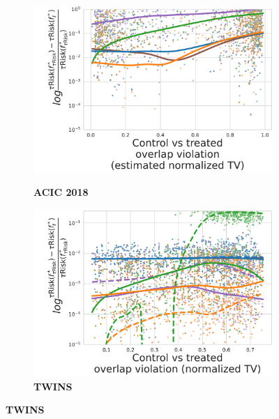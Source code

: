 \documentclass[11pt]{article}
\begin{document}
\begin{appendices}
\begin{figure}
\begin{subfigure}[b]{0.10\textwidth}
        \end{subfigure}
        \begin{subfigure}[b]{0.44\textwidth}
            \centering
            \caption{\textbf{ACIC 2018}}
            \includegraphics[width=\textwidth]{images/normalized_bias_tau_risk_to_best_method_acic_2018__nuisance_stacking__candidates_hist_gradient_boosting__tset_50.pdf}
            \label{fig:normalized_bias_tau_risk_to_best_method_acic_2018}
        \end{subfigure}
        \hfill
        \begin{subfigure}[b]{0.44\textwidth}
            \centering
            \caption{\textbf{TWINS}}
            \includegraphics[width=\textwidth]{images/normalized_bias_tau_risk_to_best_method_twins__nuisance_stacking__candidates_hist_gradient_boosting__tset_50__overlap_11-296__rs_0-9_noise10.pdf}

\end{subfigure}
\end{figure}
\end{appendices}
\end{document}
